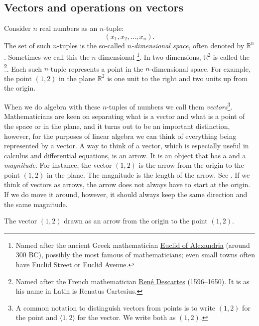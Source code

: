 \subsection{Vectors and operations on vectors}

Consider $n$ real numbers as an $n$-tuple:
\begin{equation*}
(x_1,x_2,\ldots,x_n). 
\end{equation*}
The set of such $n$-tuples is the so-called
\emph{$n$-dimensional space},
often denoted by ${\mathbb R}^n$.
Sometimes we call this the $n$-dimensional
\emph{}%
\footnote{Named after the ancient Greek mathematician
\href{https://en.wikipedia.org/wiki/Euclid}{Euclid of Alexandria}
(around 300 BC), possibly the most famous of mathematicians; even
small towns often have Euclid Street or Euclid Avenue.}. 
In two dimensions, ${\mathbb R}^2$ is called the
\emph{}%
\footnote{Named after the French mathematician
\href{https://en.wikipedia.org/wiki/Descartes}{Ren\'e Descartes}
(1596--1650).  It is  as his name in Latin is Renatus
Cartesius.}.
Each such $n$-tuple represents a point in the $n$-dimensional space.
For example, the point
$(1,2)$ in the plane ${\mathbb R}^2$
is one unit to the right and two units up from the
origin.

When we do algebra with these $n$-tuples of numbers we call them
\emph{vectors}\footnote{%
A common notation to distinguish vectors from points is to write $(1,2)$
for the point and $\langle 1,2 \rangle$ for the vector.  We write both as
$(1,2)$.}.  Mathematicians are keen on separating
what is a vector and what is a point of the space or in the plane,
and it turns out
to be an important distinction, however, for the purposes of linear algebra
we can think of everything being represented by a vector.
A way to think of a vector, which is especially useful in calculus
and differential equations, is an arrow.  It is an object that has
a \emph{} and a \emph{magnitude}.
For instance, the vector $(1,2)$
is the arrow from the origin to the point $(1,2)$ in the plane.
The magnitude is the length of the arrow.
See .
If we think of vectors as arrows,
the arrow does not always have to start at the origin.  If we do move it
around, however, it should always keep the same direction and the same magnitude.

\begin{myfig}
\capstart
{}
\caption{The vector $(1,2)$ drawn as an arrow from the origin to the point
$(1,2)$.\label{linalg-vecarrow:fig}}
\end{myfig}


